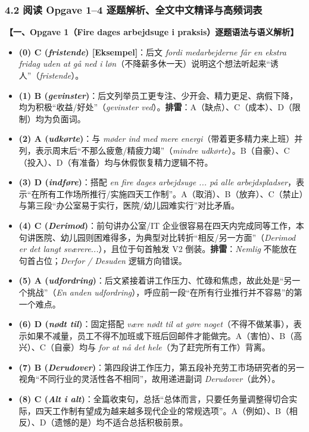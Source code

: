 \subsubsection*{4.2 阅读 Opgave 1--4 逐题解析、全文中文精译与高频词表}

\begin{answerbox}
\textbf{\color{NCDNavy}【一、Opgave 1（Fire dages arbejdsuge i praksis）逐题语法与语义解析】}
\begin{itemize}
  \item \textbf{(0) C (\textit{fristende}) [Eksempel]}：后文 \textit{fordi medarbejderne får en ekstra fridag uden at gå ned i løn}（不降薪多休一天）说明这个想法听起来“诱人”（\textit{fristende}）。
  \item \textbf{(1) B (\textit{gevinster})}：后文列举员工更专注、少开会、精力更足、病假下降，均为积极“收益/好处”（\textit{gevinster ved}）。\textbf{排雷}：A（缺点）、C（成本）、D（限制）均为负面词。
  \item \textbf{(2) A (\textit{udkørte})}：与 \textit{møder ind med mere energi}（带着更多精力来上班）并列，表示周末后“不那么疲惫/精疲力竭”（\textit{mindre udkørte}）。B（自豪）、C（投入）、D（有准备）均与休假恢复精力逻辑不符。
  \item \textbf{(3) D (\textit{indføre})}：搭配 \textit{en fire dages arbejdsuge ... på alle arbejdspladser}，表示“在所有工作场所推行/实施四天工作制”。A（取消）、B（放弃）、C（禁止）与第三段“办公室易于实行，医院/幼儿园难实行”对比矛盾。
  \item \textbf{(4) C (\textit{Derimod})}：前句讲办公室/IT 企业很容易在四天内完成同等工作，本句讲医院、幼儿园则困难得多，为典型对比转折“相反/另一方面”（\textit{Derimod er det langt sværere...}），且位于句首触发 V2 倒装。\textbf{排雷}：\textit{Nemlig} 不能放在句首占位；\textit{Derfor / Desuden} 逻辑方向错误。
  \item \textbf{(5) A (\textit{udfordring})}：后文紧接着讲工作压力、忙碌和焦虑，故此处是“另一个挑战”（\textit{En anden udfordring}），呼应前一段“在所有行业推行并不容易”的第一个难点。
  \item \textbf{(6) D (\textit{nødt til})}：固定搭配 \textit{være nødt til at gøre noget}（不得不做某事），表示如果不减量，员工不得不加班或下班后回邮件才能做完。A（害怕）、B（高兴）、C（自豪）均与 \textit{for at nå det hele}（为了赶完所有工作）背离。
  \item \textbf{(7) B (\textit{Derudover})}：第四段讲工作压力，第五段补充劳工市场研究者的另一视角“不同行业的灵活性各不相同”，故用递进副词 \textit{Derudover}（此外）。
  \item \textbf{(8) C (\textit{Alt i alt})}：全篇收束句，总括“总体而言，只要任务量调整得切合实际，四天工作制有望成为越来越多现代企业的常规选项”。A（例如）、B（相反）、D（遗憾的是）均不适合总括积极前景。
\end{itemize}
\end{answerbox}

